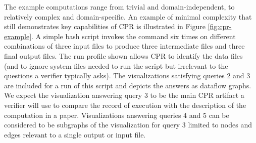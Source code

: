 The example computations range from trivial and domain-independent, to relatively complex and domain-specific. An example of minimal complexity that still demonstrates key capabilities of CPR is illustrated in Figure \ref{fig:cpr-example}. A simple bash script invokes the  command six times on different combinations of three input files to produce three intermediate files and three final output files. The run profile shown allows CPR to identify the data files (and to ignore system files needed to run the script but irrelevant to the questions a verifier typically asks).  The visualizations satisfying queries 2 and 3 are included for a run of this script and depicts the answers as dataflow graphs. We expect the visualization answering query 3 to be the main CPR artifact a verifier will use to compare the record of execution with the description of the computation in a paper. Visualizations answering queries 4 and 5 can be considered to be subgraphs of the visualization for query 3 limited to nodes and edges relevant to a single output or input file. 

